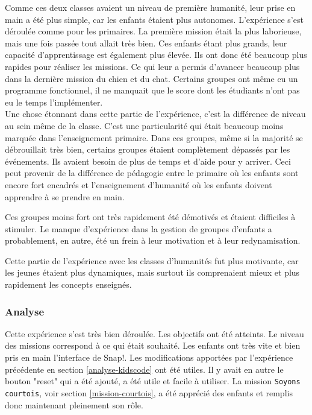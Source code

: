 Comme ces deux classes avaient un niveau de première humanité, leur prise en main a été plus simple, car les enfants étaient plus autonomes. L'expérience s'est déroulée comme pour les primaires. La première mission était la plus laborieuse, mais une fois passée tout allait très bien. Ces enfants étant plus grands, leur capacité d'apprentissage est également plus élevée. Ils ont donc été beaucoup plus rapides pour réaliser les missions. Ce qui leur a permis d'avancer beaucoup plus dans la dernière mission du chien et du chat. Certains groupes ont même eu un programme fonctionnel, il ne manquait que le score dont les étudiants n'ont pas eu le temps l'implémenter.\\

Une chose étonnant dans cette partie de l'expérience, c'est la différence de niveau au sein même de la classe. C'est une particularité qui était beaucoup moins marquée dans l'enseignement primaire. Dans ces groupes, même si la majorité se débrouillait très bien, certains groupes étaient complètement dépassés par les événements. Ils avaient besoin de plus de temps et d'aide pour y arriver. Ceci peut provenir de la différence de pédagogie entre le primaire où les enfants sont encore fort encadrés et l'enseignement d'humanité où les enfants doivent apprendre à se prendre en main.

Ces groupes moins fort ont très rapidement été démotivés et étaient difficiles à stimuler. Le manque d'expérience dans la gestion de groupes d'enfants a probablement, en autre, été un frein à leur motivation et à leur redynamisation.

Cette partie de l'expérience avec les classes d'humanités fut plus motivante, car les jeunes étaient plus dynamiques, mais surtout ils comprenaient mieux et plus rapidement les concepts enseignés.

\subsubsection{Analyse}
\label{analyse-scienceinfuse}
Cette expérience s’est très bien déroulée. Les objectifs ont été atteints. Le niveau des missions correspond à ce qui était souhaité. Les enfants ont très vite et bien pris en main l'interface de Snap!. Les modifications apportées par l'expérience précédente en section \ref{analyse-kidscode} ont été utiles. Il y avait en autre le bouton "reset" qui a été ajouté, a été utile et facile à utiliser. La mission \texttt{Soyons courtois}, voir section \ref{mission-courtois}, a été apprécié des enfants et remplis donc maintenant pleinement son rôle.\\ %

